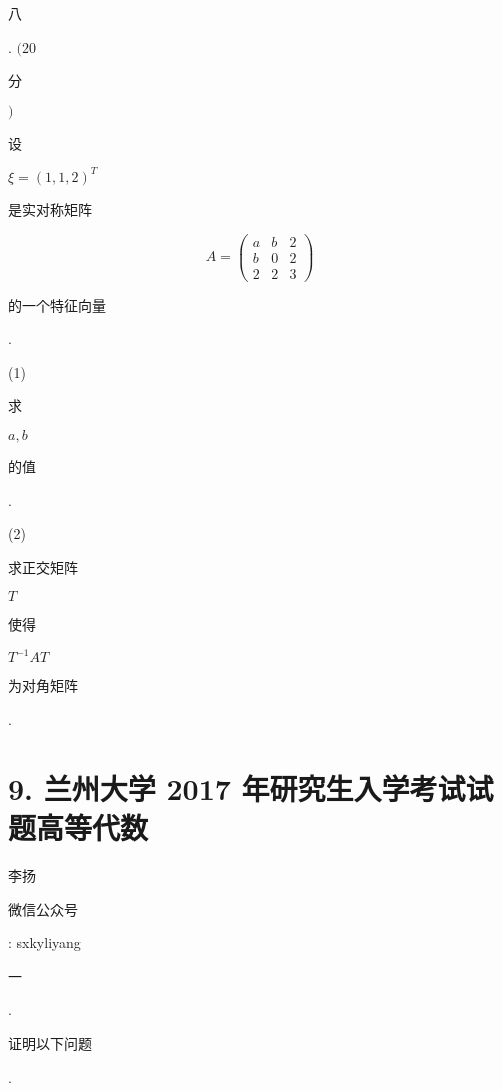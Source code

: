 \documentclass[10pt]{article}
\begin{document}
\begin{CJK}{UTF8}{mj}八\end{CJK}. $(20$ \begin{CJK}{UTF8}{mj}分\end{CJK} $)$ \begin{CJK}{UTF8}{mj}设\end{CJK} $\xi=(1,1,2)^{T}$ \begin{CJK}{UTF8}{mj}是实对称矩阵\end{CJK}
$$
A=\left(\begin{array}{lll}
a & b & 2 \\
b & 0 & 2 \\
2 & 2 & 3
\end{array}\right)
$$
\begin{CJK}{UTF8}{mj}的一个特征向量\end{CJK}.

(1) \begin{CJK}{UTF8}{mj}求\end{CJK} $a, b$ \begin{CJK}{UTF8}{mj}的值\end{CJK}.

(2) \begin{CJK}{UTF8}{mj}求正交矩阵\end{CJK} $T$ \begin{CJK}{UTF8}{mj}使得\end{CJK} $T^{-1} A T$ \begin{CJK}{UTF8}{mj}为对角矩阵\end{CJK}.

\section{9. 兰州大学 2017 年研究生入学考试试题高等代数}
\begin{CJK}{UTF8}{mj}李扬\end{CJK}

\begin{CJK}{UTF8}{mj}微信公众号\end{CJK}: sxkyliyang

\begin{CJK}{UTF8}{mj}一\end{CJK}. \begin{CJK}{UTF8}{mj}证明以下问题\end{CJK}.
\end{document}
